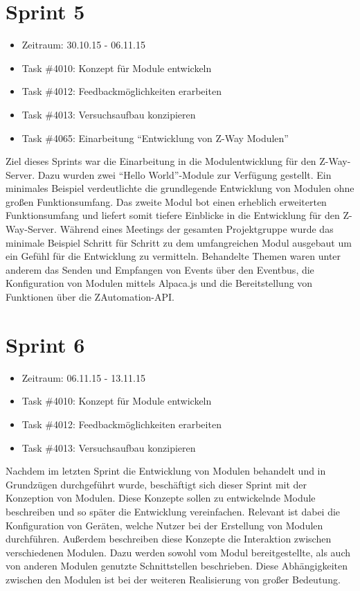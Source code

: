 \documentclass[12pt, oneside, smallheadings]{scrbook}
\begin{document}
\section{Sprint 5}
\begin{itemize}
	\item Zeitraum: 30.10.15 - 06.11.15 \newline
	\item Task \#4010: Konzept für Module entwickeln
	\item Task \#4012: Feedbackmöglichkeiten erarbeiten
	\item Task \#4013: Versuchsaufbau konzipieren
	\item Task \#4065: Einarbeitung "`Entwicklung von Z-Way Modulen"'\\
\end{itemize}
\noindent
Ziel dieses Sprints war die Einarbeitung in die Modulentwicklung für den Z-Way-Server. Dazu wurden zwei "`Hello World"'-Module zur Verfügung gestellt. Ein minimales Beispiel verdeutlichte die grundlegende Entwicklung von Modulen ohne großen Funktionsumfang. Das zweite Modul bot einen erheblich erweiterten Funktionsumfang und liefert somit tiefere Einblicke in die Entwicklung für den Z-Way-Server. Während eines Meetings der gesamten Projektgruppe wurde das minimale Beispiel Schritt für Schritt zu dem umfangreichen Modul ausgebaut um ein Gefühl für die Entwicklung zu vermitteln. Behandelte Themen waren unter anderem das Senden und Empfangen von Events über den Eventbus, die Konfiguration von Modulen mittels Alpaca.js und die Bereitstellung von Funktionen über die ZAutomation-API.

\section{Sprint 6}
\begin{itemize}
	\item Zeitraum: 06.11.15 - 13.11.15 \newline
	\item Task \#4010: Konzept für Module entwickeln	
	\item Task \#4012: Feedbackmöglichkeiten erarbeiten
	\item Task \#4013: Versuchsaufbau konzipieren\\
\end{itemize}
\noindent
Nachdem im letzten Sprint die Entwicklung von Modulen behandelt und in Grundzügen durchgeführt wurde, beschäftigt sich dieser Sprint mit der Konzeption von Modulen. Diese Konzepte sollen zu entwickelnde Module beschreiben und so später die Entwicklung vereinfachen. Relevant ist dabei die Konfiguration von Geräten, welche  Nutzer bei der Erstellung von Modulen durchführen. Außerdem beschreiben diese Konzepte die Interaktion zwischen verschiedenen Modulen. Dazu werden sowohl vom Modul bereitgestellte, als auch von anderen Modulen genutzte Schnittstellen beschrieben. Diese Abhängigkeiten zwischen den Modulen ist bei der weiteren Realisierung von großer Bedeutung.
\end{document}

